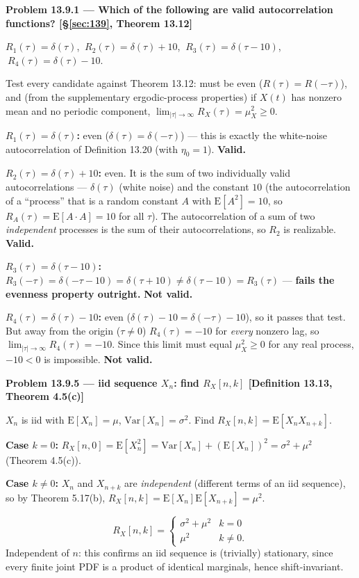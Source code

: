 \documentclass[11pt]{article}
\newcommand{\E}[1]{\mathrm{E}\left[#1\right]}
\newcommand{\Var}[1]{\mathrm{Var}\left[#1\right]}
\newcommand{\topline}[1]{\par\vspace{5pt}\noindent{\color{#1}\rule{\linewidth}{1.1pt}}\par\vspace{3pt}}
\newcommand{\botline}[1]{\par\vspace{2pt}\noindent{\color{#1}\rule{\linewidth}{1.1pt}}\par\vspace{8pt}}
\newenvironment{examprob}[2]{%
  \topline{examcol}\noindent\textbf{\color{examcol}#1 --- #2}\par\smallskip\noindent\ignorespaces
}{\botline{examcol}}
\begin{document}
\begin{examprob}{Problem 13.9.1}{Which of the following are valid autocorrelation functions? \hfill [\S\ref{sec:139}, Theorem 13.12]}
$R_1(\tau)=\delta(\tau)$, $\ R_2(\tau)=\delta(\tau)+10$, $\ R_3(\tau)=\delta(\tau-10)$, $\
R_4(\tau)=\delta(\tau)-10$.

Test every candidate against Theorem 13.12: must be even ($R(\tau)=R(-\tau)$), and (from the
supplementary ergodic-process properties) if $X(t)$ has nonzero mean and no periodic
component, $\lim_{|\tau|\to\infty}R_X(\tau)=\mu_X^2\ge0$.

\textbf{$R_1(\tau)=\delta(\tau)$:} even ($\delta(\tau)=\delta(-\tau)$) --- this is exactly the
white-noise autocorrelation of Definition 13.20 (with $\eta_0=1$). \textbf{Valid.}

\textbf{$R_2(\tau)=\delta(\tau)+10$:} even. It is the sum of two individually valid
autocorrelations --- $\delta(\tau)$ (white noise) and the constant $10$ (the autocorrelation
of a ``process'' that is a random constant $A$ with $\E{A^2}=10$, so $R_A(\tau)=\E{A\cdot
A}=10$ for all $\tau$). The autocorrelation of a sum of two \emph{independent} processes is
the sum of their autocorrelations, so $R_2$ is realizable. \textbf{Valid.}

\textbf{$R_3(\tau)=\delta(\tau-10)$:} $R_3(-\tau)=\delta(-\tau-10)=\delta(\tau+10)\ne
\delta(\tau-10)=R_3(\tau)$ --- \textbf{fails the evenness property outright.} \textbf{Not
valid.}

\textbf{$R_4(\tau)=\delta(\tau)-10$:} even ($\delta(\tau)-10=\delta(-\tau)-10$), so it passes
that test. But away from the origin ($\tau\ne0$) $R_4(\tau)=-10$ for \emph{every} nonzero lag,
so $\lim_{|\tau|\to\infty}R_4(\tau)=-10$. Since this limit must equal $\mu_X^2\ge0$ for any
real process, $-10<0$ is impossible. \textbf{Not valid.}

\end{examprob}

\begin{examprob}{Problem 13.9.5}{iid sequence $X_n$: find $R_X[n,k]$ \hfill [Definition 13.13, Theorem 4.5(c)]}
$X_n$ is iid with $\E{X_n}=\mu$, $\Var{X_n}=\sigma^2$. Find $R_X[n,k]=\E{X_nX_{n+k}}$.

\textbf{Case $k=0$:} $R_X[n,0]=\E{X_n^2}=\Var{X_n}+(\E{X_n})^2=\sigma^2+\mu^2$ (Theorem
4.5(c)).

\textbf{Case $k\ne0$:} $X_n$ and $X_{n+k}$ are \emph{independent} (different terms of an iid
sequence), so by Theorem 5.17(b), $R_X[n,k]=\E{X_n}\E{X_{n+k}}=\mu^2$.

\[
\boxed{R_X[n,k] = \begin{cases}\sigma^2+\mu^2 & k=0\\ \mu^2 & k\ne0.\end{cases}}
\]
Independent of $n$: this confirms an iid sequence is (trivially) stationary, since every
finite joint PDF is a product of identical marginals, hence shift-invariant.
\end{examprob}
\end{document}
